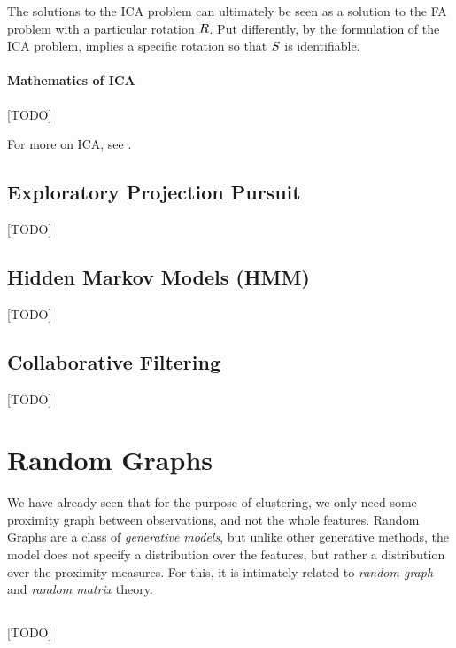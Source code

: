 \begin{remark}
The solutions to the ICA problem can ultimately be seen as a solution to the FA problem with a particular rotation $R$.
Put differently, by the formulation of the ICA problem, implies a specific rotation so that $S$ is identifiable. 
\end{remark}



\paragraph{Mathematics of ICA}
[TODO]

For more on ICA, see \cite{hyvarinen_independent_2000}. 





\subsection{Exploratory Projection Pursuit}
\label{sec:exploratpory_ppr}
[TODO]



\subsection{Hidden Markov Models (HMM)}
\label{sec:hmm}
[TODO]




\subsection{Collaborative Filtering}
\label{sec:collaborative_filtering}
[TODO]



\section{Random Graphs}
\label{sec:random_graphs}

We have already seen that for the purpose of clustering, we only need some proximity graph between observations, and not the whole features. 
Random Graphs are a class of \emph{generative models}, but unlike other generative methods, the model does not specify a distribution over the features, but rather a distribution over the proximity measures.
For this, it is  intimately related to \emph{random graph} and \emph{random matrix} theory.


\subsection{\erdos \renyi}
[TODO]

